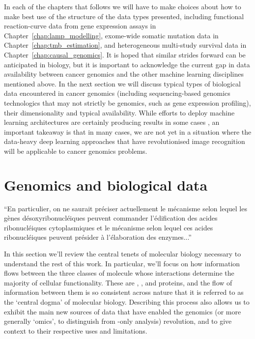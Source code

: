 \documentclass[thesis.tex]{subfiles}
\begin{document}
In each of the chapters that follows we will have to make choices about how to make best use of the structure of the data types presented, including functional reaction-curve data from gene expression assays in Chapter~\ref{chap:lamp_modelling}, exome-wide somatic mutation data in Chapter~\ref{chap:tmb_estimation}, and heterogeneous multi-study survival data in Chapter~\ref{chap:causal_genomics}. 
It is hoped that similar strides forward can be anticipated in biology, but it is important to acknowledge the current gap in data availability between cancer genomics and the other machine learning disciplines mentioned above. In the next section we will discuss typical types of biological data encountered in cancer genomics (including sequencing-based genomics technologics that may not strictly be genomics, such as gene expression profiling), their dimensionality and typical availability. While efforts to deploy machine learning architectures are certainly producing results in some cases \citep{dubourg-felonneau_flatsomatic_2019, dubourg-felonneau_learning_2019} , an important takeaway is that in many cases, we are not yet in a situation where the data-heavy deep learning approaches that have revolutionised image recognition will be applicable to cancer genomics problems. 


\section{Genomics and biological data}
\epigraph{``En particulier, on ne
saurait préciser actuellement le mécanisme selon lequel
les gènes désoxyribonucléiques peuvent commander l'édification des acides ribonucléiques cytoplasmiques et le
mécanisme selon lequel ces acides ribonucléiques
peuvent présider à l'élaboration des enzymes...''}{\citet{boivin_sur_1947}}

In this section we'll review the central tenets of molecular biology necessary to understand the rest of this work. In particular, we'll focus on how information flows between the three classes of molecule whose interactions determine the majority of cellular functionality. These are , , and proteins, and the flow of information between them is so consistent across nature that it is referred to as the `central dogma' of molecular biology. Describing this process also allows us to exhibit the main new sources of data that have enabled the genomics (or more generally `omics', to distinguish from -only analysis) revolution, and to give context to their respective uses and limitations. 
\end{document}
